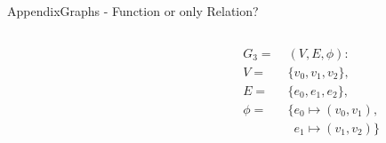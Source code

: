 \begin{frame}[allowframebreaks]{Appendix}{Graphs - Function or only Relation?}
  \begin{columns}
    \begin{column}{0.6\textwidth}
    \end{column}
    \begin{column}{0.4\textwidth}
      \begin{align*}
        G_3 =\;&\left(V,E,\phi\right):\\
        V =\;&\{v_0, v_1, v_2\}, \\
        E =\;&\{e_0, e_1, e_{2} \}, \\
        \phi = &\{e_0 \mapsto (v_0, v_1),\\ 
               &\enspace e_1 \mapsto  (v_1, v_2)\} 
      \end{align*}
    \end{column}
  \end{columns}
\end{frame}
